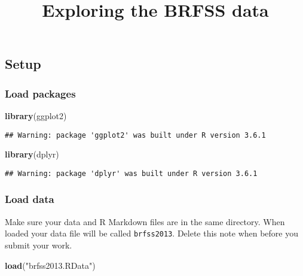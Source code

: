 \documentclass[]{article}
\title{Exploring the BRFSS data}
\author{}
\date{}
\newenvironment{Shaded}{\begin{snugshade}}{\end{snugshade}}
\newcommand{\KeywordTok}[1]{\textcolor[rgb]{0.13,0.29,0.53}{\textbf{#1}}}
\newcommand{\NormalTok}[1]{#1}
\newcommand{\StringTok}[1]{\textcolor[rgb]{0.31,0.60,0.02}{#1}}
\begin{document}
\maketitle

\hypertarget{setup}{%
\subsection{Setup}\label{setup}}

\hypertarget{load-packages}{%
\subsubsection{Load packages}\label{load-packages}}

\begin{Shaded}
\begin{Highlighting}[]
\KeywordTok{library}\NormalTok{(ggplot2)}
\end{Highlighting}
\end{Shaded}

\begin{verbatim}
## Warning: package 'ggplot2' was built under R version 3.6.1
\end{verbatim}

\begin{Shaded}
\begin{Highlighting}[]
\KeywordTok{library}\NormalTok{(dplyr)}
\end{Highlighting}
\end{Shaded}

\begin{verbatim}
## Warning: package 'dplyr' was built under R version 3.6.1
\end{verbatim}

\hypertarget{load-data}{%
\subsubsection{Load data}\label{load-data}}

Make sure your data and R Markdown files are in the same directory. When
loaded your data file will be called \texttt{brfss2013}. Delete this
note when before you submit your work.

\begin{Shaded}
\begin{Highlighting}[]
\KeywordTok{load}\NormalTok{(}\StringTok{"brfss2013.RData"}\NormalTok{)}
\end{Highlighting}
\end{Shaded}
\end{document}
